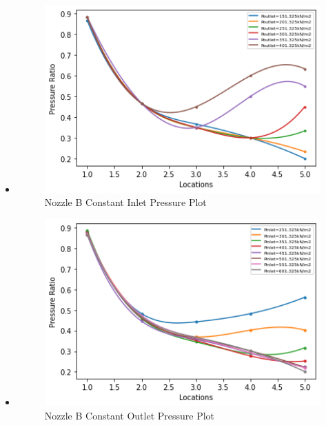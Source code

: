 \begin{itemize}
    \item {}
    \begin{figure}[!h]
    \centering
    \includegraphics[width=12cm]{figure 3.png}
    \caption{Nozzle B Constant Inlet Pressure Plot}
\end{figure}

    \item {}
    \begin{figure}[!h]
    \centering
    \includegraphics[width=12cm]{figure 4.png}
    \caption{Nozzle B Constant Outlet Pressure Plot}
\end{figure}


\end{itemize}
